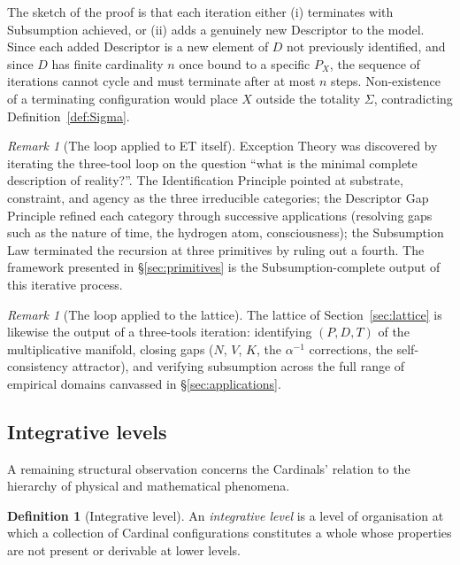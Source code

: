 \documentclass[11pt,a4paper]{article}
\theoremstyle{definition}
\newtheorem{definition}[theorem]{Definition}
\theoremstyle{remark}
\newtheorem{remark}[theorem]{Remark}
\begin{document}
The sketch of the proof is that each iteration either (i) terminates with Subsumption achieved, or (ii) adds a genuinely new Descriptor to the model. Since each added Descriptor is a new element of $D$ not previously identified, and since $D$ has finite cardinality $n$ once bound to a specific $P_{X}$, the sequence of iterations cannot cycle and must terminate after at most $n$ steps. Non-existence of a terminating configuration would place $X$ outside the totality $\Sigma$, contradicting Definition~\ref{def:Sigma}.

\begin{remark}[The loop applied to ET itself]
Exception Theory was discovered by iterating the three-tool loop on the question ``what is the minimal complete description of reality?''. The Identification Principle pointed at substrate, constraint, and agency as the three irreducible categories; the Descriptor Gap Principle refined each category through successive applications (resolving gaps such as the nature of time, the hydrogen atom, consciousness); the Subsumption Law terminated the recursion at three primitives by ruling out a fourth. The framework presented in \S\ref{sec:primitives} is the Subsumption-complete output of this iterative process.
\end{remark}

\begin{remark}[The loop applied to the lattice]
The lattice of Section~\ref{sec:lattice} is likewise the output of a three-tools iteration: identifying $(P,D,T)$ of the multiplicative manifold, closing gaps ($N$, $V$, $K$, the $\alpha^{-1}$ corrections, the self-consistency attractor), and verifying subsumption across the full range of empirical domains canvassed in \S\ref{sec:applications}.
\end{remark}

\subsection{Integrative levels}\label{subsec:levels}

A remaining structural observation concerns the Cardinals' relation to the hierarchy of physical and mathematical phenomena.

\begin{definition}[Integrative level]\label{def:levels}
An \emph{integrative level} is a level of organisation at which a collection of Cardinal configurations constitutes a whole whose properties are not present or derivable at lower levels.
\end{definition}
\end{document}
